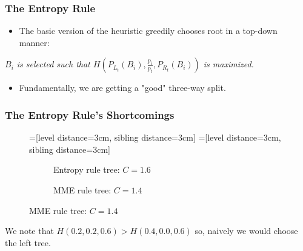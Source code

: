 \documentclass{beamer}
\theoremstyle{plain}
\begin{document}
\begin{frame} \frametitle{The Entropy Rule}\label{The Entropy Rule}

\begin{itemize}
\item The basic version of the heuristic greedily chooses root in a top-down manner:
\end{itemize}
\begin{center}
\textit{$B_i$ is selected such that $H \left( P_{L_t}(B_i), \frac{p_i}{p_t}, P_{R_t}(B_i) \right)$ is maximized.}
\end{center}

\begin{itemize}
\item Fundamentally, we are getting a "good" three-way split.
\end{itemize}

\end{frame}

\begin{frame} \frametitle{The Entropy Rule's Shortcomings}

\begin{figure}[H]
\centering
=[level distance=3cm, sibling distance=3cm]
=[level distance=3cm, sibling distance=3cm]
\scriptsize
\begin{subfigure}{.46\textwidth}
\centering
{}
\caption{Entropy rule tree: $C=1.6$}
\end{subfigure}
\begin{subfigure}{.46\textwidth}
\centering
{}
\caption{MME rule tree: $C=1.4$}
\end{subfigure}
\end{figure}

We note that $H(0.2, 0.2, 0.6) > H(0.4, 0.0, 0.6)$ so, naively we would choose the left tree.

\end{frame}
\end{document}

